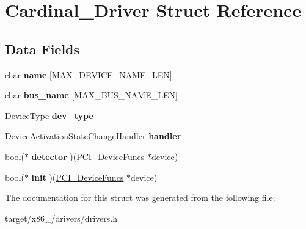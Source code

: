\hypertarget{structCardinal__Driver}{}\section{Cardinal\+\_\+\+Driver Struct Reference}
\label{structCardinal__Driver}
\subsection*{Data Fields}
\begin{DoxyCompactItemize}
\item 
char {\bfseries name} \mbox{[}M\+A\+X\+\_\+\+D\+E\+V\+I\+C\+E\+\_\+\+N\+A\+M\+E\+\_\+\+L\+EN\mbox{]}\hypertarget{structCardinal__Driver_a2aa6bebf5ceb4eea364979400f98d4cf}{}\label{structCardinal__Driver_a2aa6bebf5ceb4eea364979400f98d4cf}

\item 
char {\bfseries bus\+\_\+name} \mbox{[}M\+A\+X\+\_\+\+B\+U\+S\+\_\+\+N\+A\+M\+E\+\_\+\+L\+EN\mbox{]}\hypertarget{structCardinal__Driver_a30bd78e92db051f754bc365696ac5f28}{}\label{structCardinal__Driver_a30bd78e92db051f754bc365696ac5f28}

\item 
Device\+Type {\bfseries dev\+\_\+type}\hypertarget{structCardinal__Driver_a2c345bed22a4f617c4988211aba8ba53}{}\label{structCardinal__Driver_a2c345bed22a4f617c4988211aba8ba53}

\item 
Device\+Activation\+State\+Change\+Handler {\bfseries handler}\hypertarget{structCardinal__Driver_a6e505de22ca3af71aab68fc64ea0d194}{}\label{structCardinal__Driver_a6e505de22ca3af71aab68fc64ea0d194}

\item 
bool($\ast$ {\bfseries detector} )(\hyperlink{structPCI__DeviceFuncs}{P\+C\+I\+\_\+\+Device\+Funcs} $\ast$device)\hypertarget{structCardinal__Driver_a3c8a171b9eea19109af8170c9803405f}{}\label{structCardinal__Driver_a3c8a171b9eea19109af8170c9803405f}

\item 
bool($\ast$ {\bfseries init} )(\hyperlink{structPCI__DeviceFuncs}{P\+C\+I\+\_\+\+Device\+Funcs} $\ast$device)\hypertarget{structCardinal__Driver_a5237756097eb9c8afbba46bebb22ad27}{}\label{structCardinal__Driver_a5237756097eb9c8afbba46bebb22ad27}

\end{DoxyCompactItemize}


The documentation for this struct was generated from the following file\+:\begin{DoxyCompactItemize}
\item 
target/x86\+\_/drivers/drivers.\+h\end{DoxyCompactItemize}
